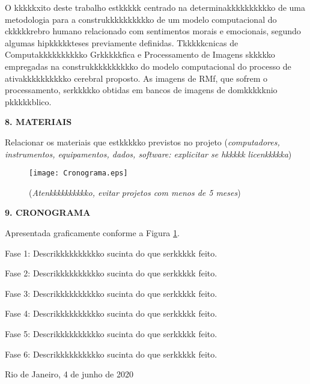 \documentclass[a4paper,12pt,oneside,openany]{report}
\begin{document}
O kkkkkxito deste trabalho estkkkkk centrado na determinakkkkkkkkkko de uma metodologia para a construkkkkkkkkkko de um modelo computacional do ckkkkkrebro humano relacionado com sentimentos morais e emocionais, segundo algumas hipkkkkkteses previamente definidas. Tkkkkkcnicas de Computakkkkkkkkkko Grkkkkkfica e Processamento de Imagens skkkkko empregadas na construkkkkkkkkkko do modelo computacional \cite{Lins98} do processo de ativakkkkkkkkkko cerebral proposto. As imagens de RMf, que sofrem o processamento, serkkkkko obtidas em bancos de imagens de domkkkkknio pkkkkkblico.

\vspace{0.4cm}
\textbf{8. MATERIAIS}
	
Relacionar os materiais que estkkkkko previstos no projeto (\textit{computadores, instrumentos, equipamentos, dados, software: explicitar se hkkkkk licenkkkkka})

\begin{figure}
      \begin{center}
      \parbox[h]{14cm}
        {
        \begin{center}
        \texttt{[image: Cronograma.eps]}
        \caption[\small{(\textit{Atenkkkkkkkkkko, evitar projetos com menos de 5 meses})}]{\label{Fig:Cronograma} \footnotesize{(\textit{Atenkkkkkkkkkko, evitar projetos com menos de 5 meses})}}
        \end{center}
        }
      \end{center}
\end{figure} 

\vspace{0.4cm}
\textbf{9. CRONOGRAMA}

Apresentada graficamente conforme a Figura \ref{Fig:Cronograma}.

Fase 1: Descrikkkkkkkkkko sucinta do que serkkkkk feito.

Fase 2: Descrikkkkkkkkkko sucinta do que serkkkkk feito.

Fase 3: Descrikkkkkkkkkko sucinta do que serkkkkk feito.

Fase 4: Descrikkkkkkkkkko sucinta do que serkkkkk feito.

Fase 5: Descrikkkkkkkkkko sucinta do que serkkkkk feito.

Fase 6: Descrikkkkkkkkkko sucinta do que serkkkkk feito.



 


      \vspace{2cm}
      \noindent
Rio de Janeiro, 4 de junho de 2020
\end{document}
